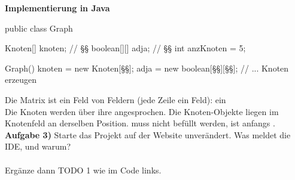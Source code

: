 \documentclass[11pt,a4paper]{article}
\begin{document}
\newpage
\textbf{Implementierung in Java} \\[1mm]
\begin{minipage}[t]{0.57\linewidth}
\vspace{0pt}
\begin{java}[basicstyle=\ttfamily\footnotesize]
public class Graph {
   Knoten[] knoten;     // §§
   boolean[][] adja;    // §§
   int anzKnoten = 5;

   Graph() {
      knoten = new Knoten[§§];
      adja = new boolean[§§][§§];
      // ... Knoten erzeugen
   }
}
\end{java}
\end{minipage}\hfill
\begin{minipage}[t]{0.4\linewidth}
\vspace{0pt}\small\raggedright
Die Matrix ist ein Feld von Feldern (jede Zeile ein Feld): ein \\[1mm]
Die Knoten werden über ihre  angesprochen. Die Knoten-Objekte liegen im Knotenfeld an derselben Position.  muss nicht befüllt werden,  ist anfangs .\\[1.5mm]
\textbf{Aufgabe 3)} Starte das Projekt auf der Website unverändert. Was meldet die IDE, und warum?\\
\\[1mm]
Ergänze dann TODO 1 wie im Code links.
\end{minipage}
\end{document}
